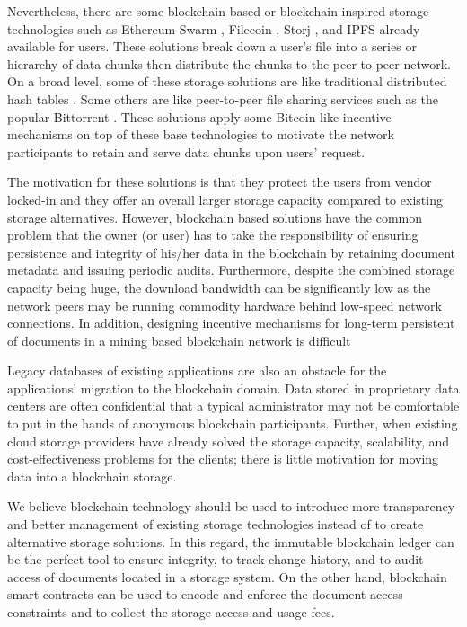 Nevertheless, there are some blockchain based or blockchain inspired storage technologies such as Ethereum Swarm \cite{swarm}, Filecoin \cite{filecoin}, Storj \cite{Wilkinson14storja}, and IPFS \cite{ipfs} already available for users. These solutions break down a user's file into a series or hierarchy of data chunks then distribute the chunks to the peer-to-peer network. On a broad level, some of these storage solutions are like traditional distributed hash tables \cite{Maymounkov:2002:KPI:646334.687801} \cite{10.1007/978-3-540-45172-3_4}. Some others are like peer-to-peer file sharing services such as the popular Bittorrent \cite{Pouwelse:2005:BPF:2138958.2138984}. These solutions apply some Bitcoin-like incentive mechanisms on top of these base technologies to motivate the network participants to retain and serve data chunks upon users' request.  

The motivation for these solutions is that they protect the users from vendor locked-in and they offer an overall larger storage capacity compared to existing storage alternatives. However, blockchain based solutions have the common problem that the owner (or user) has to take the responsibility of ensuring persistence and integrity of his/her data in the blockchain by retaining document metadata and issuing periodic audits. Furthermore, despite the combined storage capacity being huge, the download bandwidth can be significantly low as the network peers may be running commodity hardware behind low-speed network connections. In addition, designing incentive mechanisms for long-term persistent of documents in a mining based blockchain network is difficult 

Legacy databases of existing applications are also an obstacle for the applications' migration to the blockchain domain. Data stored in proprietary data centers are often confidential that a typical administrator may not be comfortable to put in the hands of anonymous blockchain participants. Further, when existing cloud storage providers \cite{Murty:2008:PAW:1407893} \cite{googleCloud} have already solved the storage capacity, scalability, and cost-effectiveness problems for the clients; there is little motivation for moving data into a blockchain storage.     

We believe blockchain technology should be used to introduce more transparency and better management of existing storage technologies instead of to create alternative storage solutions. In this regard, the immutable blockchain ledger can be the perfect tool to ensure integrity, to track change history, and to audit access of documents located in a storage system. On the other hand, blockchain smart contracts can be used to encode and enforce the document access constraints and to collect the storage access and usage fees.         

